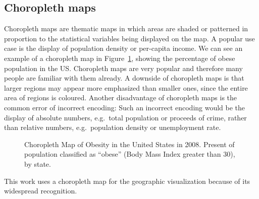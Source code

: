 \subsection{Choropleth maps}
Choropleth maps are thematic maps in which areas are shaded or patterned in proportion to the statistical variables being displayed on the map.
A popular use case is the display of population density or per-capita income.
We can see an example of a choropleth map in Figure~\ref{fig:related-work:choropleth}, showing the percentage of obese population in the US\@.
Choropleth maps are very popular and therefore many people are familiar with them already.
A downside of choropleth maps is that larger regions may appear more emphasized than smaller ones, since the entire area of regions is coloured.
Another disadvantage of choropleth maps is the common error of incorrect encoding:
Such an incorrect encoding would be the display of absolute numbers, e.g.\ total population or proceeds of crime, rather than relative numbers, e.g.\ population density or unemployment rate.

\begin{figure}[ht]
  \centering
  \caption{%
    Choropleth Map of Obesity in the United States in 2008.
    Present of population classified as ``obese'' (Body Mass Index greater than 30), by state.
  }\label{fig:related-work:choropleth}
\end{figure}

This work uses a choropleth map for the geographic visualization because of its widespread recognition.



